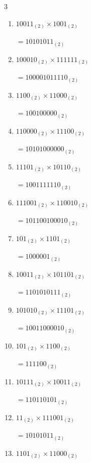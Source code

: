 \begin{multicols}{3}
\begin{enumerate}
  \item $10011_{(2)} \times 1001_{(2)}$

        $=10101011_{(2)}$

\columnbreak %

  \item $100010_{(2)} \times 111111_{(2)}$

        $=100001011110_{(2)}$

  \item $1100_{(2)} \times 11000_{(2)}$

        $=100100000_{(2)}$

  \item $110000_{(2)} \times 11100_{(2)}$

        $=10101000000_{(2)}$

  \item $11101_{(2)} \times 10110_{(2)}$

        $=1001111110_{(2)}$

  \item $111001_{(2)} \times 110010_{(2)}$

        $=101100100010_{(2)}$

\columnbreak %

  \item $101_{(2)} \times 1101_{(2)}$

        $=1000001_{(2)}$

  \item $10011_{(2)} \times 101101_{(2)}$

        $=1101010111_{(2)}$

  \item $101010_{(2)} \times 11101_{(2)}$

        $=10011000010_{(2)}$

  \item $101_{(2)} \times 1100_{(2)}$

        $=111100_{(2)}$

  \item $10111_{(2)} \times 10011_{(2)}$

        $=110110101_{(2)}$

\columnbreak %

\resetques

  \item $11_{(2)} \times 111001_{(2)}$

        $=10101011_{(2)}$

  \item $1101_{(2)} \times 11000_{(2)}$


\end{enumerate}
\end{multicols}
